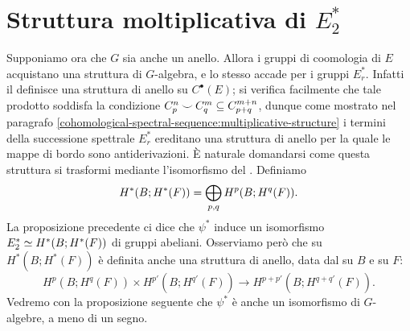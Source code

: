 \section{Struttura moltiplicativa di \texorpdfstring{\(E^*_2\)}{E*2}}
Supponiamo ora che \(G\) sia anche un anello. Allora i gruppi di coomologia di \(E\) acquistano una struttura di \(G\)-algebra, e lo stesso accade per i gruppi \(E^\ast_r\). Infatti il \cupproduct{} definisce una struttura di anello su \(C^\bullet(E)\); si verifica facilmente che tale prodotto soddisfa la condizione \(C^n_p\mathbin{\smile} C^m_q\subseteq C^{m+n}_{p+q}\), dunque come mostrato nel paragrafo \ref{cohomological-spectral-sequence:multiplicative-structure} i termini della successione spettrale \(E^\ast_r\) ereditano una struttura di anello per la quale le mappe di bordo sono antiderivazioni. È naturale domandarsi come questa struttura si trasformi mediante l'isomorfismo del .
Definiamo
\[
H^*(B;H^*(F))=\bigoplus_{p,q}H^p(B;H^q(F)).
\]
La proposizione precedente ci dice che \(\psi^*\) induce un isomorfismo \(E^\ast_2\simeq H^*(B;H^*(F))\) di gruppi abeliani.
Osserviamo però che su \(H^*(B;H^*(F))\) è definita anche una struttura di anello, data dal \cupproduct{} su \(B\) e su \(F\):
\[
H^p(B;H^q(F))\times H^{p'}(B;H^{q'}(F))\longrightarrow H^{p+p'}(B;H^{q+q'}(F)).
\]
Vedremo con la proposizione seguente che \(\psi^*\) è anche un isomorfismo di \(G\)-algebre, a meno di un segno.

